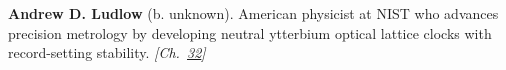 \textbf{Andrew D. Ludlow} (b. unknown). American physicist at NIST who advances precision metrology by developing neutral ytterbium optical lattice clocks with record-setting stability. \emph{[Ch.~\hyperref[ch:atomic]{32}]}

